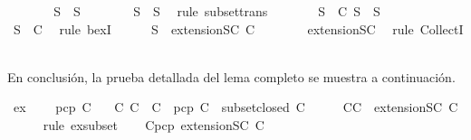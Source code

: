 \begin{isabellebody}
\ \ \ \ \isamarkupfalse%
\ \isamarkupfalse%
\ {\isachardoublequoteopen}S{\isacharprime}{\isacharprime}\ {\isasymsubseteq}\ S{\isachardoublequoteclose}\isanewline
\ \ \ \ \ \ \isamarkupfalse%
\ {\isacartoucheopen}S{\isacharprime}\ {\isasymsubseteq}\ S{\isacartoucheclose}\ \isamarkupfalse%
\ {\isacharparenleft}rule\ subset{\isacharunderscore}trans{\isacharparenright}\isanewline
\ \ \ \ \isamarkupfalse%
\ \isamarkupfalse%
\ {\isachardoublequoteopen}{\isasymexists}S\ {\isasymin}\ C{\isachardot}\ S{\isacharprime}{\isacharprime}\ {\isasymsubseteq}\ S{\isachardoublequoteclose}\isanewline
\ \ \ \ \ \ \isamarkupfalse%
\ {\isacartoucheopen}S\ {\isasymin}\ C{\isacartoucheclose}\ \isamarkupfalse%
\ {\isacharparenleft}rule\ bexI{\isacharparenright}\isanewline
\ \ \ \ \isamarkupfalse%
\ {\isachardoublequoteopen}S{\isacharprime}{\isacharprime}\ {\isasymin}\ {\isacharparenleft}extensionSC\ C{\isacharparenright}{\isachardoublequoteclose}\isanewline
\ \ \ \ \ \ \isamarkupfalse%
\ extensionSC\ \isamarkupfalse%
\ {\isacharparenleft}rule\ CollectI{\isacharparenright}\isanewline
\ \ \isamarkupfalse%
\isanewline
{}\isamarkupfalse%
%
\endisatagproof
{\isafoldproof}%
%
\isadelimproof
%
\endisadelimproof
%
\begin{isamarkuptext}%
En conclusión, la prueba detallada del lema completo se muestra a continuación.%
\end{isamarkuptext}\isamarkuptrue%
\isamarkupfalse%
\ ex{}{\isacharcolon}\ \isanewline
\ \ \ {\isachardoublequoteopen}pcp\ C{\isachardoublequoteclose}\isanewline
\ \ \ {\isachardoublequoteopen}{\isasymexists}C{\isacharprime}{\isachardot}\ C\ {\isasymsubseteq}\ C{\isacharprime}\ {\isasymand}\ pcp\ C{\isacharprime}\ {\isasymand}\ subset{\isacharunderscore}closed\ C{\isacharprime}{\isachardoublequoteclose}\isanewline
%
\isadelimproof
%
\endisadelimproof
%
\isatagproof
{}\isamarkupfalse%
\ {\isacharminus}\isanewline
\ \ \isamarkupfalse%
\ C{}{\isacharcolon}{\isachardoublequoteopen}C\ {\isasymsubseteq}\ {\isacharparenleft}extensionSC\ C{\isacharparenright}{\isachardoublequoteclose}\isanewline
\ \ \ \ \isamarkupfalse%
\ {\isacharparenleft}rule\ ex{}{\isacharunderscore}subset{\isacharparenright}\isanewline
\ \ \isamarkupfalse%
\ C{}{\isacharcolon}{\isachardoublequoteopen}pcp\ {\isacharparenleft}extensionSC\ C{\isacharparenright}{\isachardoublequoteclose}\isanewline

\end{isabellebody}
